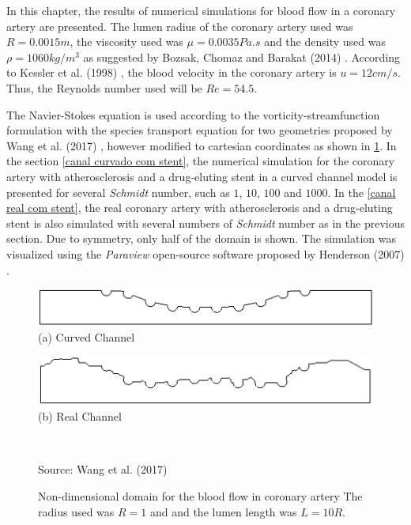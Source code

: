 In this chapter, the results of numerical simulations for 
blood flow in a coronary artery are presented. 
The lumen radius of the coronary artery used was $R=0.0015m$, 
the viscosity used was $\mu=0.0035Pa.s$ and the density used was
$\rho=1060kg/m^3$ as suggested by Bozsak, Chomaz and Barakat (2014)
 \cite{bozsak2014}. According to Kessler et al. (1998) 
\cite{kessler1998}, the blood velocity in the coronary artery 
is $u=12cm/s$. Thus, the Reynolds number used will be 
$Re=54.5$. 

\medskip
The Navier-Stokes equation is used according to the 
vorticity-streamfunction formulation with 
the species transport equation for two geometries proposed 
by Wang et al. (2017) \cite{wang2017}, however modified to 
cartesian coordinates as shown in \ref{coronary artery geo}. 
In the section \ref{canal curvado com stent}, the numerical 
simulation for the coronary artery with atherosclerosis 
and a drug-eluting stent in a curved channel model 
is presented for several 
\textit{Schmidt} number, such as $1$, $10$, $100$ and $1000$. 
In the \ref{canal real com stent}, the real coronary 
artery with atherosclerosis and a drug-eluting stent is also 
simulated with several numbers of \textit{Schmidt} number 
as in the previous section.
Due to symmetry, only half of the domain is shown. 
The simulation was visualized using the \textit{Paraview} open-source 
software proposed by Henderson (2007) \cite{paraview}.


\begin{figure}[H]
     \caption{Non-dimensional domain for the blood flow in coronary artery
     The radius used was $R=1$ and and the lumen length was $L=10R$.}
     \begin{center}
     \begin{minipage}{.45\linewidth}
     \begin{center}
      \includegraphics[scale=0.22]{./02_chaps/cap_solution/figure/CurvedStrut.png}\\
     (a) Curved Channel
     \end{center}
     \end{minipage}%
     \begin{minipage}{.45\linewidth}
     \begin{center}
      \includegraphics[scale=0.22]{./02_chaps/cap_solution/figure/RealStrut.png}\\
     (b) Real Channel
     \end{center}
     \end{minipage}\\[3mm]
     \end{center}
     \source Source: Wang et al. (2017) \cite{wang2017}
     \label{coronary artery geo}
\end{figure}
